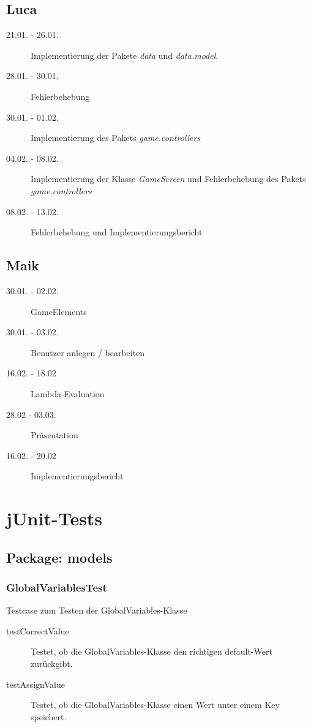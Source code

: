 \documentclass[parskip=full]{scrreprt}
\begin{document}
\section{Luca}

\begin{description}
\item[21.01. - 26.01.]
Implementierung der Pakete \emph{data} und \emph{data.model}.
\item[28.01. - 30.01.]
Fehlerbehebung
\item[30.01. - 01.02.]
Implementierung des Pakets \emph{game.controllers}
\item[04.02. - 08.02.]
Implementierung der Klasse \emph{GameScreen} und Fehlerbehebung des Pakets \emph{game.controllers}
\item[08.02. - 13.02.]
Fehlerbehebung und Implementierungsbericht
\end{description}

\section{Maik}
\begin{description}
\item[30.01. - 02.02.] GameElements
\item[30.01. - 03.02.] Benutzer anlegen / bearbeiten
\item[16.02. - 18.02] Lambda-Evaluation
\item[28.02 - 03.03.] Präsentation
\item[16.02. - 20.02] Implementierungsbericht
\end{description}

\chapter{jUnit-Tests}

\section{Package: models}

\subsection{GlobalVariablesTest}

Testcase zum Testen der GlobalVariables-Klasse

\begin{description} 
\item[testCorrectValue]
	Testet, ob die GlobalVariables-Klasse den richtigen default-Wert zurückgibt.
\item[testAssignValue]
	Testet, ob die GlobalVariables-Klasse einen Wert unter einem Key speichert.
\end{description}
\end{document}
